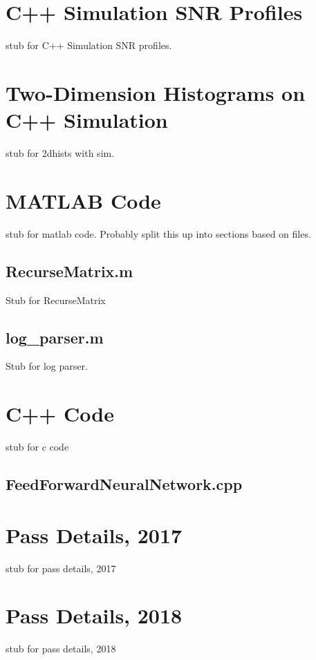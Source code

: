 
\begin{appendices}
\chapter{C++ Simulation SNR Profiles}\label{app:cSNRProfiles_all}
\par stub for C++ Simulation SNR profiles.

\chapter{Two-Dimension Histograms on C++ Simulation}\label{app:2dHistSim}
\par stub for 2dhists with sim.

\chapter{MATLAB Code}\label{app:MatlabCode}
\par stub for matlab code. Probably split this up into sections based on files.
\section{RecurseMatrix.m}\label{app:MatlabCode:recurseMatrix}
\par Stub for RecurseMatrix

\section{log\_parser.m}\label{app:MatlabCode:parser}
\par Stub for log parser.

\chapter{C++ Code} \label{app:CppCode}
\par stub for c code
\section{FeedForwardNeuralNetwork.cpp} \label{app:CppCode:ffnn}


\chapter{Pass Details, 2017}
\par stub for pass details, 2017
\chapter{Pass Details, 2018}
\par stub for pass details, 2018



\end{appendices}